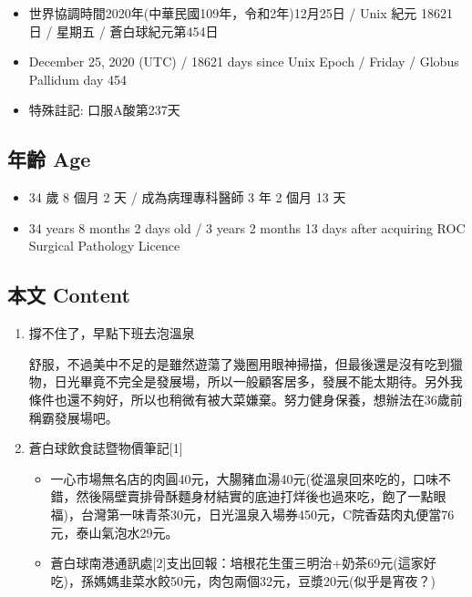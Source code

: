 \documentclass[a5paper, 11pt
]{book}
\providecommand{\tightlist}{%
  \setlength{\itemsep}{0pt}\setlength{\parskip}{0pt}}
\begin{document}
\begin{itemize}
\tightlist
\item
  世界協調時間2020年(中華民國109年，令和2年)12月25日 / Unix 紀元 18621
  日 / 星期五 / 蒼白球紀元第454日
\item
  December 25, 2020 (UTC) / 18621 days since Unix Epoch / Friday /
  Globus Pallidum day 454
\item
  特殊註記: 口服A酸第237天
\end{itemize}

\hypertarget{ux5e74ux9f61-age-24}{%
\subsection{年齡 Age}\label{ux5e74ux9f61-age-24}}

\begin{itemize}
\tightlist
\item
  34 歲 8 個月 2 天 / 成為病理專科醫師 3 年 2 個月 13 天
\item
  34 years 8 months 2 days old / 3 years 2 months 13 days after
  acquiring ROC Surgical Pathology Licence
\end{itemize}

\hypertarget{ux672cux6587-content-24}{%
\subsection{本文 Content}\label{ux672cux6587-content-24}}

\begin{enumerate}
\def\labelenumi{\arabic{enumi}.}
\item
  撐不住了，早點下班去泡溫泉

  舒服，不過美中不足的是雖然遊蕩了幾圈用眼神掃描，但最後還是沒有吃到獵物，日光畢竟不完全是發展場，所以一般顧客居多，發展不能太期待。另外我條件也還不夠好，所以也稍微有被大菜嫌棄。努力健身保養，想辦法在36歲前稱霸發展場吧。
\item
  蒼白球飲食誌暨物價筆記{[}1{]}

  \begin{itemize}
  \tightlist
  \item
    一心市場無名店的肉圓40元，大腸豬血湯40元(從溫泉回來吃的，口味不錯，然後隔壁賣排骨酥麵身材結實的底迪打烊後也過來吃，飽了一點眼福)，台灣第一味青茶30元，日光溫泉入場券450元，C院香菇肉丸便當76元，泰山氣泡水29元。
  \item
    蒼白球南港通訊處{[}2{]}支出回報：培根花生蛋三明治+奶茶69元(這家好吃)，孫媽媽韭菜水餃50元，肉包兩個32元，豆漿20元(似乎是宵夜？)
  \end{itemize}
\end{enumerate}
\end{document}
